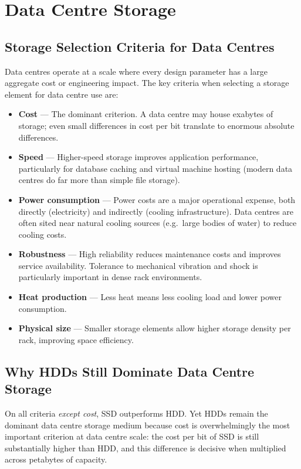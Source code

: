 \documentclass[11pt, a4paper, notitlepage]{report}
\theoremstyle{definition}
\theoremstyle{remark}
\theoremstyle{definition}
\begin{document}
\section{Data Centre Storage}
\label{ch:datacentre}

\subsection{Storage Selection Criteria for Data Centres}
\label{sec:dc-criteria}

Data centres operate at a scale where every design parameter has a large aggregate cost or engineering impact. The key criteria when selecting a storage element for data centre use are:

\begin{itemize}
  \item \textbf{Cost} — The dominant criterion. A data centre may house exabytes of storage; even small differences in cost per bit translate to enormous absolute differences.
  \item \textbf{Speed} — Higher-speed storage improves application performance, particularly for database caching and virtual machine hosting (modern data centres do far more than simple file storage).
  \item \textbf{Power consumption} — Power costs are a major operational expense, both directly (electricity) and indirectly (cooling infrastructure). Data centres are often sited near natural cooling sources (e.g.\ large bodies of water) to reduce cooling costs.
  \item \textbf{Robustness} — High reliability reduces maintenance costs and improves service availability. Tolerance to mechanical vibration and shock is particularly important in dense rack environments.
  \item \textbf{Heat production} — Less heat means less cooling load and lower power consumption.
  \item \textbf{Physical size} — Smaller storage elements allow higher storage density per rack, improving space efficiency.
\end{itemize}

\subsection{Why HDDs Still Dominate Data Centre Storage}
\label{sec:dc-hdd-dominance}

On all criteria \emph{except cost}, SSD outperforms HDD. Yet HDDs remain the dominant data centre storage medium because cost is overwhelmingly the most important criterion at data centre scale: the cost per bit of SSD is still substantially higher than HDD, and this difference is decisive when multiplied across petabytes of capacity.
\end{document}

